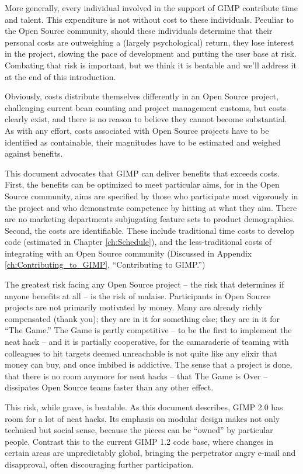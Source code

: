 More generally, every individual involved in the support of GIMP
contribute time and talent. This expenditure is not without cost to
these individuals. Peculiar to the Open Source community, should these
individuals determine that their personal costs are outweighing a
(largely psychological) return, they lose interest in the project,
slowing the pace of development and putting the user base at risk.
Combating that risk is important, but we think it is beatable and
we'll address it at the end of this introduction.

Obviously, costs distribute themselves differently in an Open Source
project, challenging current bean counting and project management
customs, but costs clearly exist, and there is no reason to believe
they cannot become substantial. As with any effort, costs associated
with Open Source projects have to be identified as containable, their
magnitudes have to be estimated and weighed against benefits.

This document advocates that GIMP can deliver benefits that exceeds
costs. First, the benefits can be optimized to meet particular aims,
for in the Open Source community, aims are specified by those who
participate most vigorously in the project and who demonstrate
competence by hitting at what they aim. There are no marketing
departments subjugating feature sets to product demographics. Second,
the costs are identifiable. These include traditional time costs to
develop code (estimated in Chapter \ref{ch:Schedule}), and the
less-traditional costs of integrating with an Open Source community
(Discussed in Appendix \ref{ch:Contributing_to_GIMP}, ``Contributing
to GIMP.'')

The greatest risk facing any Open Source project -- the risk
that determines if anyone benefits at all -- is the risk of malaise.
Participants in Open Source projects are not primarily motivated by
money. Many are already richly compensated (thank you); they 
are in it for something else; they are in it for ``The Game.''
The Game is partly competitive -- to be the first to implement
the neat hack -- and it is partially cooperative, for the 
camaraderie of teaming with colleagues to hit targets deemed
unreachable is not quite like any elixir that money can buy, and
once imbibed is addictive. The sense that a project is 
done, that there is no room anymore for neat hacks -- that The
Game is Over -- dissipates Open Source teams faster than any
other effect.

This risk, while grave, is beatable. As this document describes,
GIMP 2.0 has room for a lot of neat hacks. Its emphasis on modular
design makes not only technical but social sense, because
the pieces can be ``owned'' by particular people. Contrast
this to the current GIMP 1.2 code base, where changes in certain 
areas are unpredictably global, bringing the perpetrator angry
e-mail and disapproval, often discouraging further participation. 

